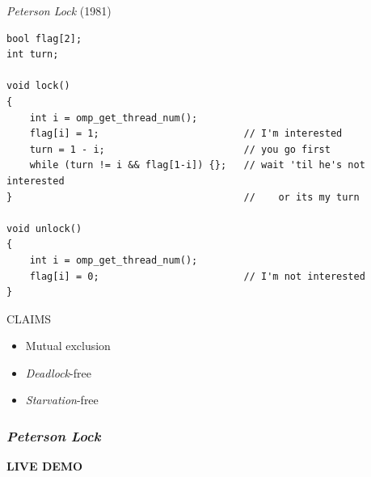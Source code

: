 \documentclass[xcolor={x11names,svgnames},x11names,svgnames]{beamer}
\begin{document}
\begin{frame}[fragile, label=peterson_code]
  \begin{block}{\emph{Peterson Lock} (1981)}
    \vspace*{-2ex}
\begin{verbatim}
bool flag[2];
int turn;

void lock()
{
    int i = omp_get_thread_num();
    flag[i] = 1;                         // I'm interested
    turn = 1 - i;                        // you go first
    while (turn != i && flag[1-i]) {};   // wait 'til he's not interested
}                                        //    or its my turn

void unlock() 
{
    int i = omp_get_thread_num();
    flag[i] = 0;                         // I'm not interested
}
\end{verbatim}
\end{block}

\begin{alertblock}{CLAIMS}
  \begin{itemize}
  \item Mutual exclusion
  \item \emph{Deadlock}-free
  \item \emph{Starvation}-free
  \end{itemize}
\end{alertblock}
\end{frame}


\begin{frame}[label=peterson_demo]
  \frametitle{\emph{Peterson Lock}}

  \centering \Huge \bfseries LIVE DEMO
\end{frame}

\end{document}
